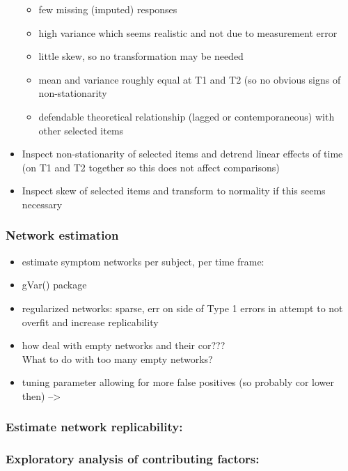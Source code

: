 \documentclass[
  english,
  man]{apa6}
\begin{document}
\begin{itemize}
  \begin{itemize}
  \item
    few missing (imputed) responses
  \item
    high variance which seems realistic and not due to measurement error
  \item
    little skew, so no transformation may be needed
  \item
    mean and variance roughly equal at T1 and T2 (so no obvious signs of non-stationarity
  \item
    defendable theoretical relationship (lagged or contemporaneous) with other selected items
  \end{itemize}
\item
  Inspect non-stationarity of selected items and detrend linear effects of time (on T1 and T2 together so this does not affect comparisons)
\item
  Inspect skew of selected items and transform to normality if this seems necessary
\end{itemize}

\hypertarget{network-estimation}{%
\subsubsection{Network estimation}\label{network-estimation}}

\begin{itemize}
\item
  estimate symptom networks per subject, per time frame:
\item
  gVar() package
\item
  regularized networks: sparse, err on side of Type 1 errors in attempt to not overfit and increase replicability
\item
  how deal with empty networks and their cor???\\
  What to do with too many empty networks?
\item
  tuning parameter allowing for more false positives (so probably cor lower then) --\textgreater{}
\end{itemize}

\hypertarget{estimate-network-replicability}{%
\subsubsection{Estimate network replicability:}\label{estimate-network-replicability}}

\hypertarget{exploratory-analysis-of-contributing-factors}{%
\subsubsection{Exploratory analysis of contributing factors:}\label{exploratory-analysis-of-contributing-factors}}
\end{document}
